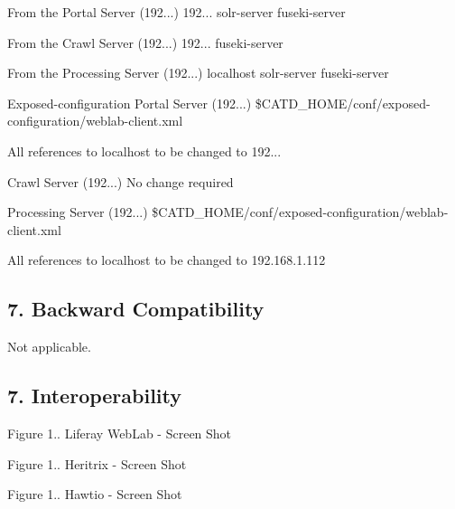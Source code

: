 From the Portal Server (192...) 192... solr-\/server fuseki-\/server

From the Crawl Server (192...) 192... fuseki-\/server

From the Processing Server (192...) localhost solr-\/server fuseki-\/server

Exposed-\/configuration Portal Server (192...) \$\+C\+A\+T\+D\+\_\+\+H\+O\+M\+E/conf/exposed-\/configuration/weblab-\/client.xml

All references to localhost to be changed to 192...

Crawl Server (192...) No change required

Processing Server (192...) \$\+C\+A\+T\+D\+\_\+\+H\+O\+M\+E/conf/exposed-\/configuration/weblab-\/client.xml

\begin{DoxyVerb}All references to localhost to be changed to 192.168.1.112
\end{DoxyVerb}
\hypertarget{index_sec_7_2}{}\subsection{7.	\+Backward Compatibility}\label{index_sec_7_2}
\begin{DoxyVerb}Not applicable.
\end{DoxyVerb}
\hypertarget{index_sec_7_3}{}\subsection{7.	\+Interoperability}\label{index_sec_7_3}
 \begin{center} Figure 1.. Liferay Web\+Lab -\/ Screen Shot \end{center} 

 \begin{center} Figure 1.. Heritrix -\/ Screen Shot \end{center} 

 \begin{center} Figure 1.. Hawtio -\/ Screen Shot \end{center} 

